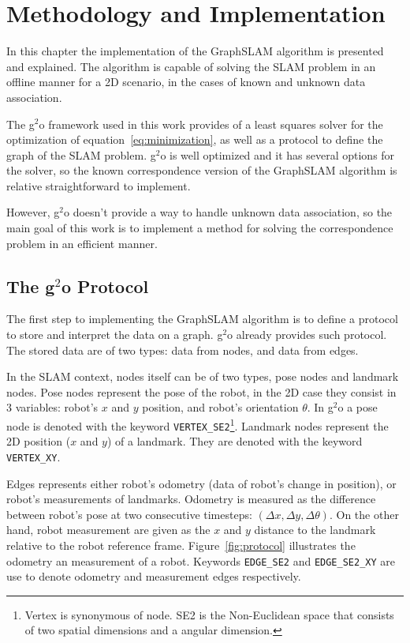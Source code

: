 \chapter{Methodology and Implementation}
\label{chap:implementation}
 
In this chapter the implementation of the GraphSLAM algorithm is presented and explained. The algorithm is capable of solving the SLAM problem in an offline manner for a 2D scenario, in the cases of known and unknown data association.

The g$^2$o framework used in this work provides of a least squares solver for the optimization of equation~\eqref{eq:minimization}, as well as a protocol to define the graph of the SLAM problem. g$^2$o is well optimized and it has several options for the solver, so the known correspondence version of the GraphSLAM algorithm is relative straightforward to implement.

However, g$^2$o doesn't provide a way to handle unknown data association, so the main goal of this work is to implement a method for solving the correspondence problem in an efficient manner.

\section{The g$^2$o Protocol}

The first step to implementing the GraphSLAM algorithm is to define a protocol to store and interpret the data on a graph. g$^2$o already provides such protocol. The stored data are of two types: data from nodes, and data from edges. 

In the SLAM context, nodes itself can be of two types, pose nodes and landmark nodes. Pose nodes represent the pose of the robot, in the 2D case they consist in 3 variables: robot's $x$ and $y$ position, and robot's orientation $\theta$. In g$^2$o a pose node is denoted with the keyword \texttt{VERTEX\_SE2}\footnote{Vertex is synonymous of node. SE2 is the Non-Euclidean space that consists of two spatial dimensions and a angular dimension.}. Landmark nodes represent the 2D position ($x$ and $y$) of a landmark. They are denoted with the keyword \texttt{VERTEX\_XY}.

Edges represents either robot's odometry (data of robot's change in position), or robot's measurements of landmarks. Odometry is measured as the difference between robot's pose at two consecutive timesteps: $(\Delta x, \Delta y, \Delta \theta)$. On the other hand, robot measurement are given as the $x$ and $y$ distance to the landmark relative to the robot reference frame. Figure~\ref{fig:protocol} illustrates the odometry an measurement of a robot. Keywords \texttt{EDGE\_SE2} and \texttt{EDGE\_SE2\_XY} are use to denote odometry and measurement edges respectively.

